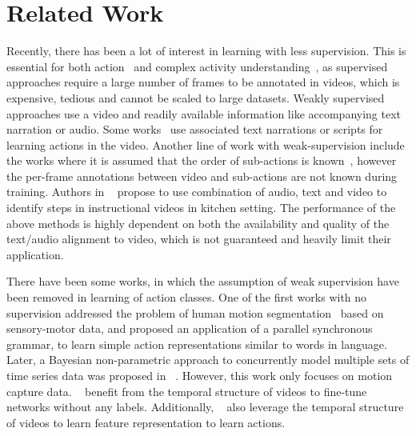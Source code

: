 \documentclass[final]{cvpr}
\begin{document}
\section{Related Work}
\par Recently, there has been a lot of interest in learning with less supervision.
This is essential for both action~\cite{rl-a-simonyan2014two, rl-a-carreira2017quo, rl-a-feichtenhofer2019slowfast} and complex activity understanding~\cite{rl-c-yeung2016end, rl-huang2016connectionist, rl-c-shou2017cdc}, as supervised approaches  require a large number of frames to be annotated in videos, which is expensive, tedious and cannot be scaled to large datasets.
Weakly supervised approaches use a video and readily available information  like accompanying text narration or audio.
Some works~\cite{rl-laptev2008learning, rl-sener2015unsupervised} use associated text narrations or scripts for learning actions in the video.
Another line of work with weak-supervision include the works where it is assumed that the  order of sub-actions is  known~\cite{tcfpn-ding2018weakly, rl-kuehne2017weakly, rl-richard2017weakly, nnvit-richard2018neuralnetwork}, however the per-frame annotations between video and sub-actions are not known during training.
Authors in ~\cite{rl-malmaud2015s} propose to use combination of audio, text and video to identify steps in instructional videos in kitchen setting. 
The performance of the above methods is highly dependent on  both the availability and quality of the text/audio alignment to video, which is not guaranteed and heavily limit their application.

\par There have been some works, in which the assumption of  weak supervision have been removed in learning of action classes. One of the first works with no supervision addressed the problem of human motion segmentation~\cite{rl-u-guerra2007language} based on sensory-motor data, and proposed an application of a parallel synchronous grammar,  to learn simple action representations similar to words in language. Later,   a Bayesian non-parametric approach to concurrently model multiple sets of time series data was proposed in ~\cite{rl-u-fox2014joint}. However, this work only focuses on motion capture data. ~\cite{rl-u-wang2015unsupervised, brattoli2017lstm}  benefit from the temporal structure of videos to fine-tune networks without any labels. Additionally, ~\cite{rl-ua-ramanathan2015learning, rl-ua-fernando2015modeling, rl-ua-cherian2017generalized, rl-ua-lee2017unsupervised} also leverage the temporal structure of videos to learn feature representation to learn actions. 
\end{document}
